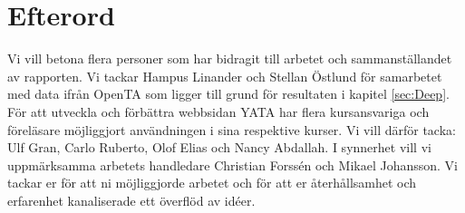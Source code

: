 \chapter*{Efterord}
\noindent Vi vill betona flera personer som har bidragit till arbetet och sammanställandet av rapporten. Vi tackar Hampus Linander och Stellan Östlund för samarbetet med data ifrån OpenTA som ligger till grund för resultaten i kapitel \ref{sec:Deep}. För att utveckla och förbättra webbsidan YATA har flera kursansvariga och föreläsare möjliggjort användningen i sina respektive kurser. Vi vill därför tacka: Ulf Gran, Carlo Ruberto, Olof Elias och Nancy Abdallah. I synnerhet vill vi uppmärksamma arbetets handledare Christian Forssén och Mikael Johansson. Vi tackar er för att ni möjliggjorde arbetet och för att er återhållsamhet och erfarenhet kanaliserade ett överflöd av idéer. 
